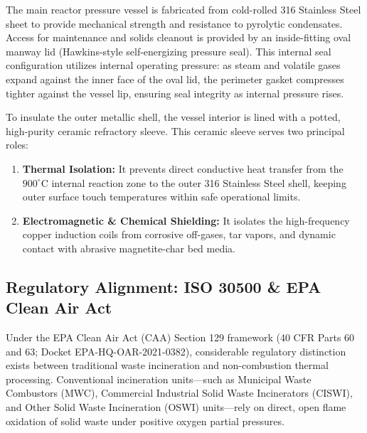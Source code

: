 \documentclass[10pt,twocolumn,a4paper]{article}
\begin{document}
The main reactor pressure vessel is fabricated from cold-rolled 316 Stainless Steel sheet to provide mechanical strength and resistance to pyrolytic condensates. Access for maintenance and solids cleanout is provided by an inside-fitting oval manway lid (Hawkins-style self-energizing pressure seal). This internal seal configuration utilizes internal operating pressure: as steam and volatile gases expand against the inner face of the oval lid, the perimeter gasket compresses tighter against the vessel lip, ensuring seal integrity as internal pressure rises.

To insulate the outer metallic shell, the vessel interior is lined with a potted, high-purity ceramic refractory sleeve. This ceramic sleeve serves two principal roles:

\begin{enumerate}[leftmargin=*]
    \item \textbf{Thermal Isolation:} It prevents direct conductive heat transfer from the $900^\circ\text{C}$ internal reaction zone to the outer 316 Stainless Steel shell, keeping outer surface touch temperatures within safe operational limits.
    \item \textbf{Electromagnetic \& Chemical Shielding:} It isolates the high-frequency copper induction coils from corrosive off-gases, tar vapors, and dynamic contact with abrasive magnetite-char bed media.
\end{enumerate}

\subsection{Regulatory Alignment: ISO 30500 \& EPA Clean Air Act}

Under the EPA Clean Air Act (CAA) Section 129 framework (40 CFR Parts 60 and 63; Docket EPA-HQ-OAR-2021-0382), considerable regulatory distinction exists between traditional waste incineration and non-combustion thermal processing. Conventional incineration units—such as Municipal Waste Combustors (MWC), Commercial Industrial Solid Waste Incinerators (CISWI), and Other Solid Waste Incineration (OSWI) units—rely on direct, open flame oxidation of solid waste under positive oxygen partial pressures.
\end{document}
